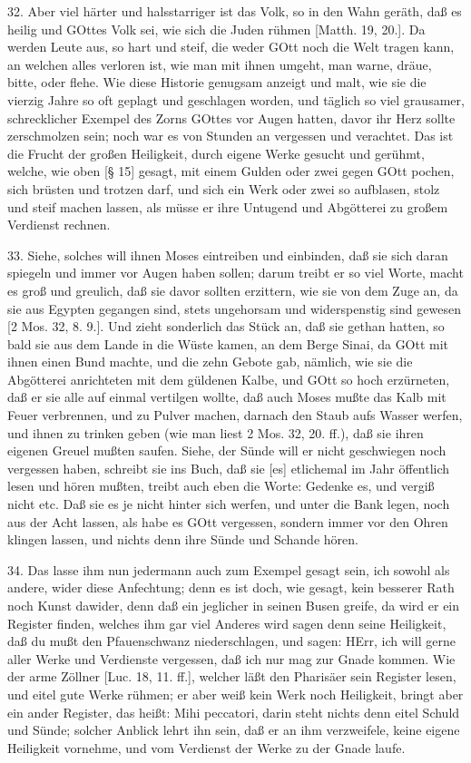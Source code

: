 32. Aber viel härter und halsstarriger ist das Volk, so in den Wahn geräth, daß es heilig und GOttes Volk sei, wie sich die Juden rühmen [Matth. 19, 20.]. Da werden Leute aus, so hart und steif, die weder GOtt noch die Welt tragen kann, an welchen alles verloren ist, wie man mit ihnen umgeht, man warne, dräue, bitte, oder flehe. Wie diese Historie genugsam anzeigt und malt, wie sie die vierzig Jahre so oft geplagt und geschlagen worden, und täglich so viel grausamer, schrecklicher Exempel des Zorns GOttes vor Augen hatten, davor ihr Herz sollte zerschmolzen sein; noch war es von Stunden an vergessen und verachtet. Das ist die Frucht der
großen Heiligkeit, durch eigene Werke gesucht und gerühmt, welche, wie oben [§ 15] gesagt, mit einem Gulden oder zwei gegen GOtt pochen, sich brüsten und trotzen darf, und sich ein Werk oder zwei so aufblasen, stolz und steif machen lassen, als müsse er ihre Untugend und Abgötterei zu großem Verdienst rechnen.

33. Siehe, solches will ihnen Moses eintreiben und einbinden, daß sie sich daran spiegeln und immer vor Augen haben sollen; darum treibt er so viel Worte, macht es groß und greulich, daß sie davor sollten erzittern, wie sie von dem Zuge an, da sie aus Egypten gegangen sind, stets ungehorsam und widerspenstig sind gewesen [2 Mos. 32, 8. 9.]. Und zieht sonderlich das Stück an, daß sie gethan hatten, so bald sie aus dem Lande in die Wüste kamen, an dem Berge Sinai, da GOtt mit ihnen einen Bund machte, und die zehn Gebote gab, nämlich, wie sie die Abgötterei anrichteten mit dem güldenen Kalbe, und GOtt so hoch erzürneten, daß er sie alle auf einmal vertilgen wollte, daß auch Moses mußte das Kalb mit Feuer verbrennen, und zu Pulver machen, darnach den Staub aufs Wasser werfen, und ihnen zu trinken geben (wie man liest 2 Mos. 32, 20. ff.), daß sie ihren eigenen Greuel mußten saufen. Siehe, der Sünde will er nicht geschwiegen noch vergessen haben, schreibt sie ins Buch, daß sie [es] etlichemal im Jahr öffentlich lesen und hören mußten, treibt auch eben die Worte: Gedenke es, und vergiß nicht etc. Daß sie es je nicht hinter sich werfen, und unter die Bank legen, noch aus der Acht lassen, als habe es GOtt vergessen, sondern immer vor den Ohren klingen lassen, und nichts denn ihre Sünde und Schande hören.

34. Das lasse ihm nun jedermann auch zum Exempel gesagt sein, ich sowohl als andere, wider diese Anfechtung; denn es ist doch, wie gesagt, kein besserer Rath noch Kunst dawider, denn daß ein jeglicher in seinen Busen greife, da wird er ein Register finden, welches ihm gar viel Anderes wird sagen denn seine Heiligkeit, daß du mußt den Pfauenschwanz niederschlagen, und sagen: HErr, ich will gerne aller Werke und Verdienste vergessen, daß ich nur mag zur Gnade kommen. Wie der arme Zöllner [Luc. 18, 11. ff.], welcher läßt den Pharisäer sein Register lesen, und eitel gute Werke rühmen; er aber weiß kein Werk noch Heiligkeit, bringt aber ein ander Register, das heißt: Mihi peccatori, darin steht nichts denn eitel Schuld und Sünde; solcher Anblick lehrt ihn sein, daß er an ihm verzweifele, keine eigene Heiligkeit vornehme, und vom Verdienst der Werke zu der Gnade laufe.

